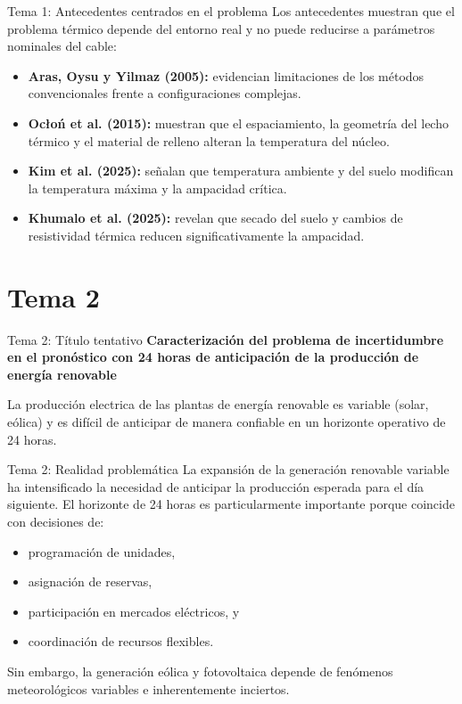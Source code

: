 \documentclass[aspectratio=169]{beamer}
\begin{document}
\begin{frame}{Tema 1: Antecedentes centrados en el problema}
\justifying
Los antecedentes muestran que el problema térmico depende del entorno real y no puede reducirse a parámetros nominales del cable:
\begin{itemize}[leftmargin=*]
    \item \textbf{Aras, Oysu y Yilmaz (2005):} evidencian limitaciones de los métodos convencionales frente a configuraciones complejas.
    \item \textbf{Ocłoń et al. (2015):} muestran que el espaciamiento, la geometría del lecho térmico y el material de relleno alteran la temperatura del núcleo.
    \item \textbf{Kim et al. (2025):} señalan que temperatura ambiente y del suelo modifican la temperatura máxima y la ampacidad crítica.
    \item \textbf{Khumalo et al. (2025):} revelan que secado del suelo y cambios de resistividad térmica reducen significativamente la ampacidad.
\end{itemize}
\end{frame}

\section{Tema 2}

\begin{frame}{Tema 2: Título tentativo}
\textbf{{\Large Caracterización del problema de incertidumbre en el pronóstico con 24 horas de anticipación de la producción de energía renovable}}

\vspace{0.8em}
\justifying
La producción electrica de las plantas de energía renovable es variable (solar, eólica) y es difícil de anticipar de manera confiable en un horizonte operativo de 24 horas.
\end{frame}

\begin{frame}{Tema 2: Realidad problemática}
\justifying
La expansión de la generación renovable variable ha intensificado la necesidad de anticipar la producción esperada para el día siguiente. El horizonte de 24 horas es particularmente importante porque coincide con decisiones de:
\begin{itemize}[leftmargin=*]
    \item programación de unidades,
    \item asignación de reservas,
    \item participación en mercados eléctricos, y
    \item coordinación de recursos flexibles.
\end{itemize}

\vspace{0.5em}
Sin embargo, la generación eólica y fotovoltaica depende de fenómenos meteorológicos variables e inherentemente inciertos.
\end{frame}
\end{document}
